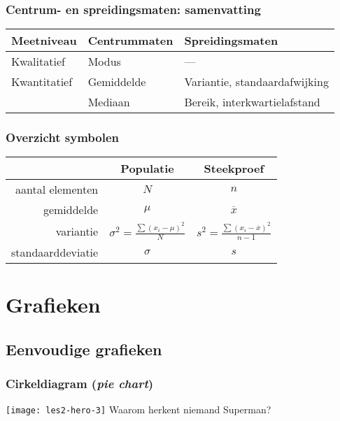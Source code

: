 \documentclass[aspectratio=169]{beamer}
\begin{document}
\begin{frame}
  \frametitle{Centrum- en spreidingsmaten: samenvatting}
  
  \centering
  \begin{tabular}{lll}
  	\toprule
  	\textbf{Meetniveau} & \textbf{Centrummaten} & \textbf{Spreidingsmaten}      \\
  	\midrule
  	Kwalitatief         & Modus                 & ---                           \\
  	\midrule
  	Kwantitatief        & Gemiddelde            & Variantie, standaardafwijking \\
  	                    & Mediaan               & Bereik, interkwartielafstand  \\
  	\bottomrule
  \end{tabular}
\end{frame}

\begin{frame}
  \frametitle{Overzicht symbolen}
  
  {\tabulinesep=1.2mm
    \begin{center}
      \begin{tabular}{rcc}
      	\toprule
      	                  & \textbf{Populatie} & \textbf{Steekproef} \\
      	\midrule
      	 aantal elementen &        $N$         &         $n$         \\
      	       gemiddelde &       $\mu$        &   $\overline{x}$    \\
      	        variantie & $\sigma^2 = \frac{\sum (x_i-\mu)^2}{N}$ & $s^2  = \frac{\sum (x_i-\overline{x})^2}{n-1}$ \\
      	standaarddeviatie &      $\sigma$      &         $s$         \\
      	\bottomrule
      \end{tabular}
    \end{center}
  }
\end{frame}

\section{Grafieken}

\subsection{Eenvoudige grafieken}

\begin{frame}
  \frametitle{Cirkeldiagram (\emph{pie chart})}
  
  \centering
  \texttt{[image: les2-hero-3]}
  Waarom herkent niemand Superman?
  
\end{frame}
\end{document}
